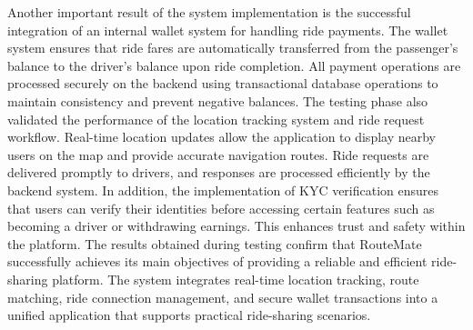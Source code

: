 \documentclass[10pt,a4paper]{report}
\begin{document}
\justify\large Another important result of the system implementation is the successful integration of an internal wallet system for handling ride payments. The wallet system ensures that ride fares are automatically transferred from the passenger’s balance to the driver’s balance upon ride completion. All payment operations are processed securely on the backend using transactional database operations to maintain consistency and prevent negative balances.
\justify\large The testing phase also validated the performance of the location tracking system and ride request workflow. Real-time location updates allow the application to display nearby users on the map and provide accurate navigation routes. Ride requests are delivered promptly to drivers, and responses are processed efficiently by the backend system.
\justify\large In addition, the implementation of KYC verification ensures that users can verify their identities before accessing certain features such as becoming a driver or withdrawing earnings. This enhances trust and safety within the platform.
\justify\large The results obtained during testing confirm that RouteMate successfully achieves its main objectives of providing a reliable and efficient ride-sharing platform. The system integrates real-time location tracking, route matching, ride connection management, and secure wallet transactions into a unified application that supports practical ride-sharing scenarios.
\end{document}

